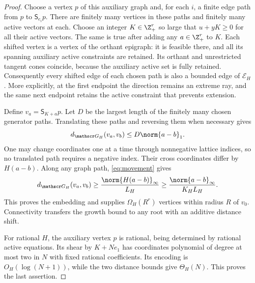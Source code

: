 \begin{proof}
Choose a vertex $p$ of this auxiliary graph and, for each $i$, a finite edge path from $p$ to $\mathsf S_{e_i}p$. There are finitely many vertices in these paths and finitely many active vectors at each. Choose an integer $K\in\Z_+^r$ so large that $u+yK\ge0$ for all their active vectors. The same is true after adding any $a\in\Z_+^r$ to $K$. Each shifted vertex is a vertex of the orthant epigraph: it is feasible there, and all its spanning auxiliary active constraints are retained. Its orthant and unrestricted tangent cones coincide, because the auxiliary active set is fully retained. Consequently every shifted edge of each chosen path is also a bounded edge of $\mathcal E_H$. More explicitly, at the first endpoint the direction remains an extreme ray, and the same next endpoint retains the active constraint that prevents extension.

Define $v_a=\mathsf S_{K+a}p$. Let $D$ be the largest length of the finitely many chosen generator paths. Translating these paths and reversing them when necessary gives
\[
 d_{\mathscr G_H}(v_a,v_b)\le D\norm{a-b}_1.
\]
One may change coordinates one at a time through nonnegative lattice indices, so no translated path requires a negative index. Their cross coordinates differ by $H(a-b)$. Along any graph path, \eqref{eq:movement} gives
\[
 d_{\mathscr G_H}(v_a,v_b)
 \ge\frac{\norm{H(a-b)}_\infty}{L_H}
 \ge\frac{\norm{a-b}_\infty}{K_HL_H}.
\]
This proves the embedding and supplies $\Omega_H(R^r)$ vertices within radius $R$ of $v_0$. Connectivity transfers the growth bound to any root with an additive distance shift.

For rational $H$, the auxiliary vertex $p$ is rational, being determined by rational active equations. Its shear by $K+Ne_1$ has coordinates polynomial of degree at most two in $N$ with fixed rational coefficients. Its encoding is $O_H(\log(N+1))$, while the two distance bounds give $\Theta_H(N)$. This proves the last assertion.
\end{proof}

